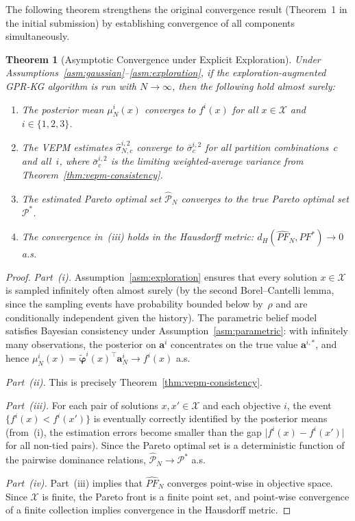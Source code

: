 \documentclass[12pt]{article}
\theoremstyle{plain}
\newtheorem{theorem}{Theorem}[section]
\theoremstyle{definition}
\theoremstyle{remark}
\begin{document}
The following theorem strengthens the original convergence result (Theorem~1
in the initial submission) by establishing convergence of all components
simultaneously.

\begin{theorem}[Asymptotic Convergence under Explicit Exploration]\label{thm:asymptotic}
Under Assumptions~\ref{asm:gaussian}--\ref{asm:exploration}, if the
exploration-augmented GPR-KG algorithm is run with $N\to\infty$, then the following hold
almost surely:
\begin{enumerate}[label=(\roman*)]
  \item The posterior mean $\mu_{N}^{i}(x)$ converges to $f^{i}(x)$ for
    all $x\in\mathcal{X}$ and $i\in\{1,2,3\}$.
  \item The VEPM estimates $\hat{\sigma}_{N,c}^{i,2}$ converge to
    $\bar{\sigma}_{c}^{i,2}$ for all partition combinations~$c$ and all~$i$,
    where $\bar{\sigma}_{c}^{i,2}$ is the limiting weighted-average variance
    from Theorem~\ref{thm:vepm-consistency}.
  \item The estimated Pareto optimal set $\hat{\mathcal{P}}_{N}$ converges
    to the true Pareto optimal set $\mathcal{P}^{*}$.
  \item The convergence in~(iii) holds in the Hausdorff metric:
    $d_{H}(\widehat{PF}_{N},PF^{*})\to0$ a.s.
\end{enumerate}
\end{theorem}

\begin{proof}
\emph{Part~(i).}
Assumption~\ref{asm:exploration} ensures that every solution
$x\in\mathcal{X}$ is sampled infinitely often almost surely (by the
second Borel--Cantelli lemma, since the sampling events have probability
bounded below by~$\rho$ and are conditionally independent given the
history).  The parametric belief model satisfies Bayesian consistency
under Assumption~\ref{asm:parametric}: with infinitely many observations,
the posterior on $\mathbf{a}^{i}$ concentrates on the true value
$\mathbf{a}^{i,*}$, and hence
$\mu_{N}^{i}(x)=\tilde{\boldsymbol{\varphi}}^{i}(x)^{\!\top}
\mathbf{a}_{N}^{i}\to f^{i}(x)$ a.s.

\emph{Part~(ii).}
This is precisely Theorem~\ref{thm:vepm-consistency}.

\emph{Part~(iii).}
For each pair of solutions $x,x'\in\mathcal{X}$ and each objective $i$,
the event $\{f^{i}(x)<f^{i}(x')\}$ is eventually correctly identified
by the posterior means (from~(i), the estimation errors become smaller
than the gap $\lvert f^{i}(x)-f^{i}(x')\rvert$ for all
non-tied pairs).  Since the Pareto optimal set is a deterministic function
of the pairwise dominance relations, $\hat{\mathcal{P}}_{N}\to
\mathcal{P}^{*}$ a.s.

\emph{Part~(iv).}
Part~(iii) implies that $\widehat{PF}_{N}$ converges point-wise in
objective space.  Since $\mathcal{X}$ is finite, the Pareto front is a
finite point set, and point-wise convergence of a finite collection
implies convergence in the Hausdorff metric.
\end{proof}
\end{document}
